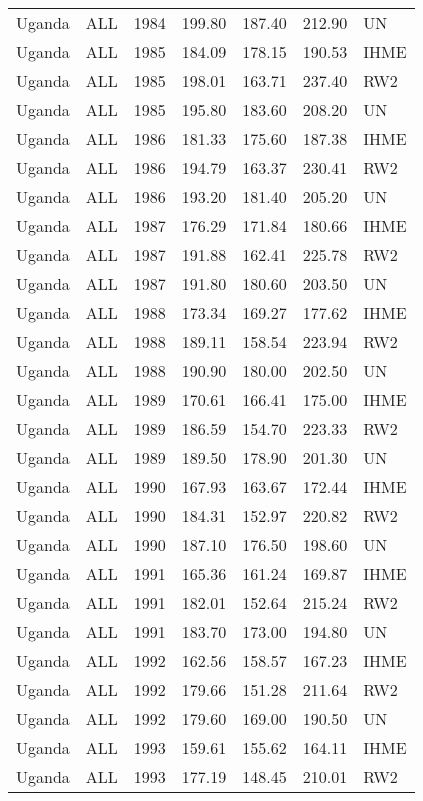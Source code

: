 \begin{longtable}{lllrrrl}
  Uganda & ALL & 1984 & 199.80 & 187.40 & 212.90 & UN \\ 
  Uganda & ALL & 1985 & 184.09 & 178.15 & 190.53 & IHME \\ 
  Uganda & ALL & 1985 & 198.01 & 163.71 & 237.40 & RW2 \\ 
  Uganda & ALL & 1985 & 195.80 & 183.60 & 208.20 & UN \\ 
  Uganda & ALL & 1986 & 181.33 & 175.60 & 187.38 & IHME \\ 
  Uganda & ALL & 1986 & 194.79 & 163.37 & 230.41 & RW2 \\ 
  Uganda & ALL & 1986 & 193.20 & 181.40 & 205.20 & UN \\ 
  Uganda & ALL & 1987 & 176.29 & 171.84 & 180.66 & IHME \\ 
  Uganda & ALL & 1987 & 191.88 & 162.41 & 225.78 & RW2 \\ 
  Uganda & ALL & 1987 & 191.80 & 180.60 & 203.50 & UN \\ 
  Uganda & ALL & 1988 & 173.34 & 169.27 & 177.62 & IHME \\ 
  Uganda & ALL & 1988 & 189.11 & 158.54 & 223.94 & RW2 \\ 
  Uganda & ALL & 1988 & 190.90 & 180.00 & 202.50 & UN \\ 
  Uganda & ALL & 1989 & 170.61 & 166.41 & 175.00 & IHME \\ 
  Uganda & ALL & 1989 & 186.59 & 154.70 & 223.33 & RW2 \\ 
  Uganda & ALL & 1989 & 189.50 & 178.90 & 201.30 & UN \\ 
  Uganda & ALL & 1990 & 167.93 & 163.67 & 172.44 & IHME \\ 
  Uganda & ALL & 1990 & 184.31 & 152.97 & 220.82 & RW2 \\ 
  Uganda & ALL & 1990 & 187.10 & 176.50 & 198.60 & UN \\ 
  Uganda & ALL & 1991 & 165.36 & 161.24 & 169.87 & IHME \\ 
  Uganda & ALL & 1991 & 182.01 & 152.64 & 215.24 & RW2 \\ 
  Uganda & ALL & 1991 & 183.70 & 173.00 & 194.80 & UN \\ 
  Uganda & ALL & 1992 & 162.56 & 158.57 & 167.23 & IHME \\ 
  Uganda & ALL & 1992 & 179.66 & 151.28 & 211.64 & RW2 \\ 
  Uganda & ALL & 1992 & 179.60 & 169.00 & 190.50 & UN \\ 
  Uganda & ALL & 1993 & 159.61 & 155.62 & 164.11 & IHME \\ 
  Uganda & ALL & 1993 & 177.19 & 148.45 & 210.01 & RW2 \\ 

\end{longtable}
